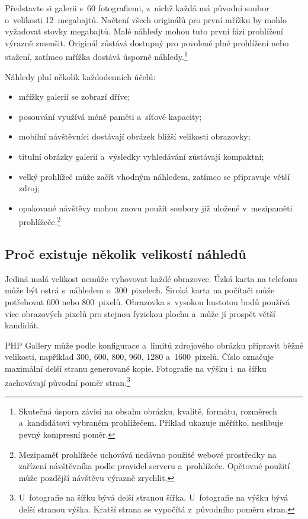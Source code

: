 \documentclass[11pt,a4paper]{article}
\begin{document}
Představte si galerii s~60 fotografiemi, z~nichž každá má původní soubor
o~velikosti 12~megabajtů. Načtení všech originálů pro první mřížku by mohlo
vyžadovat stovky megabajtů. Malé náhledy mohou tuto první fázi prohlížení
výrazně zmenšit. Originál zůstává dostupný pro povolené plné prohlížení nebo
stažení, zatímco mřížka dostává úsporné náhledy.\footnote{Skutečná úspora závisí
na obsahu obrázku, kvalitě, formátu, rozměrech a~kandidátovi vybraném
prohlížečem. Příklad ukazuje měřítko, neslibuje pevný kompresní poměr.}

Náhledy plní několik každodenních účelů:

\begin{itemize}
  \item mřížky galerií se zobrazí dříve;
  \item posouvání využívá méně paměti a~síťové kapacity;
  \item mobilní návštěvníci dostávají obrázek bližší velikosti obrazovky;
  \item titulní obrázky galerií a~výsledky vyhledávání zůstávají kompaktní;
  \item velký prohlížeč může začít vhodným náhledem, zatímco se připravuje větší
  zdroj;
  \item opakované návštěvy mohou znovu použít soubory již uložené v~mezipaměti
  prohlížeče.\footnote{Mezipaměť prohlížeče uchovává nedávno použité webové
  prostředky na zařízení návštěvníka podle pravidel serveru a~prohlížeče.
  Opětovné použití může pozdější návštěvu výrazně zrychlit.}
\end{itemize}

\subsection{Proč existuje několik velikostí náhledů}

Jediná malá velikost nemůže vyhovovat každé obrazovce. Úzká karta na telefonu
může být ostrá s~náhledem o~300~pixelech. Široká karta na počítači může
potřebovat 600 nebo 800~pixelů. Obrazovka s~vysokou hustotou bodů používá více
obrazových pixelů pro stejnou fyzickou plochu a~může jí prospět větší kandidát.

PHP Gallery může podle konfigurace a~limitů zdrojového obrázku připravit běžné
velikosti, například 300, 600, 800, 960, 1280 a~1600~pixelů. Číslo označuje
maximální delší stranu generované kopie. Fotografie na výšku i~na šířku
zachovávají původní poměr stran.\footnote{U~fotografie na šířku bývá delší
stranou šířka. U~fotografie na výšku bývá delší stranou výška. Kratší strana se
vypočítá z~původního poměru stran.}
\end{document}
